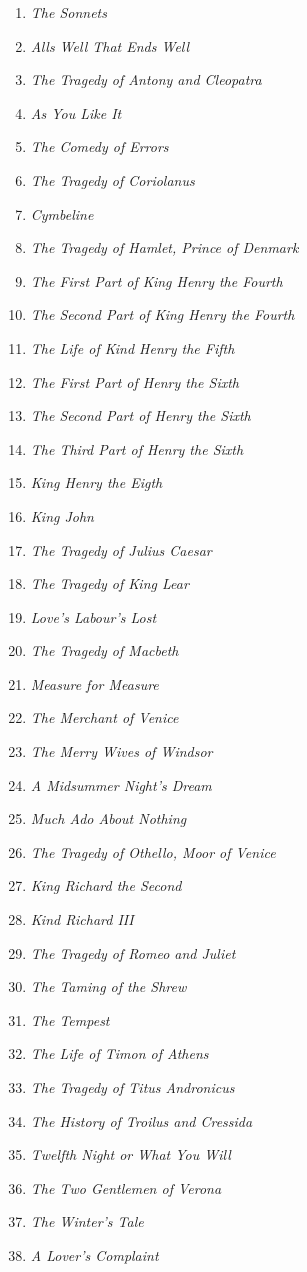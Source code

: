 \begin{enumerate}
  \item \textit{The Sonnets}
  \item \textit{Alls Well That Ends Well}
  \item \textit{The Tragedy of Antony and Cleopatra}
  \item \textit{As You Like It}
  \item \textit{The Comedy of Errors}
  \item \textit{The Tragedy of Coriolanus}
  \item \textit{Cymbeline}
  \item \textit{The Tragedy of Hamlet, Prince of Denmark}
  \item \textit{The First Part of King Henry the Fourth}
  \item \textit{The Second Part of King Henry the Fourth}
  \item \textit{The Life of Kind Henry the Fifth}
  \item \textit{The First Part of Henry the Sixth}
  \item \textit{The Second Part of Henry the Sixth}
  \item \textit{The Third Part of Henry the Sixth}
  \item \textit{King Henry the Eigth}
  \item \textit{King John}
  \item \textit{The Tragedy of Julius Caesar}
  \item \textit{The Tragedy of King Lear}
  \item \textit{Love's Labour's Lost}
  \item \textit{The Tragedy of Macbeth}
  \item \textit{Measure for Measure}
  \item \textit{The Merchant of Venice}
  \item \textit{The Merry Wives of Windsor}
  \item \textit{A Midsummer Night's Dream}
  \item \textit{Much Ado About Nothing}
  \item \textit{The Tragedy of Othello, Moor of Venice}
  \item \textit{King Richard the Second}
  \item \textit{Kind Richard III}
  \item \textit{The Tragedy of Romeo and Juliet}
  \item \textit{The Taming of the Shrew}
  \item \textit{The Tempest}
  \item \textit{The Life of Timon of Athens}
  \item \textit{The Tragedy of Titus Andronicus}
  \item \textit{The History of Troilus and Cressida}
  \item \textit{Twelfth Night or What You Will}
  \item \textit{The Two Gentlemen of Verona}
  \item \textit{The Winter's Tale}
  \item \textit{A Lover's Complaint}
\end{enumerate}

